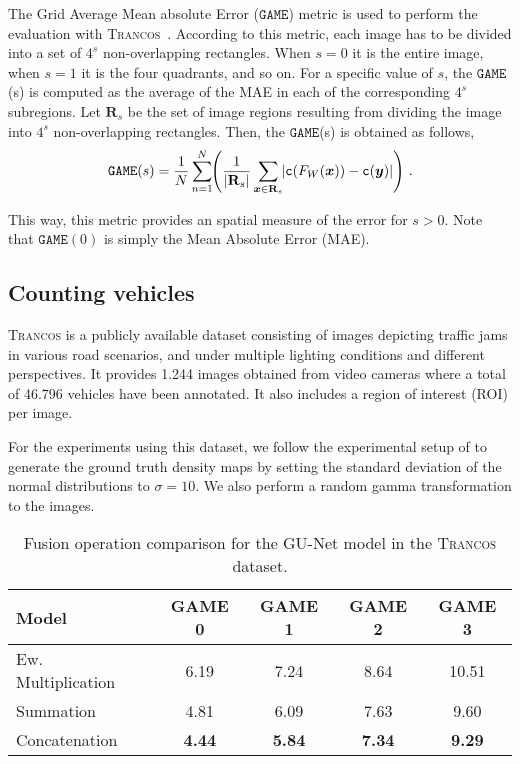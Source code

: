 \documentclass{bmvc2k}
\begin{document}
The Grid Average Mean absolute Error ($\mathtt{GAME}$) metric is used to perform the evaluation with \textsc{Trancos}~\cite{guerrero2015}. According to this metric, each image has to be divided into a set of $4^s$ non-overlapping rectangles. When $s=0$ it is the entire image, when $s=1$ it is the four quadrants, and so on. For a specific value of $s$, the $\mathtt{GAME}$(s) is computed as the average of the MAE in each of the corresponding $4^s$ subregions. Let $\mathbf{R}_{s}$ be the set of image regions resulting from dividing the image into $4^s$ non-overlapping rectangles. Then, the $\mathtt{GAME}$(s) is obtained as follows,
\vspace{-0.25cm}\begin{equation}
\mathtt{GAME}(s) = \frac{1}{N} \sum^{N}_{n=1} \hspace{-1mm} \left( \frac{1}{|\mathbf{R}_s|} \sum_{\boldsymbol{x} \in \mathbf{R}_s} \hspace{-1mm} \left| \mathtt{c}(F_W(\boldsymbol{x})) - \mathtt{c}(\boldsymbol{y})  \right|\right)\, .
\end{equation}

This way, this metric provides an spatial measure of the error for $s > 0$. Note that $\mathtt{GAME}(0)$ is simply the Mean Absolute Error (MAE).

\subsection{Counting vehicles}\textsc{Trancos} is a publicly available dataset consisting of images depicting traffic jams in various road scenarios, and under multiple lighting conditions and different perspectives. It provides 1.244 images obtained from video cameras where a total of 46.796 vehicles have been annotated. It also includes a region of interest (ROI) per image.

For the experiments using this dataset, we follow the experimental setup of \cite{guerrero2015} to generate the ground truth density maps by setting the standard deviation of the normal distributions to $\sigma=10$. We also perform a random gamma transformation to the images.

\begin{table}[t!]
\small
\centering
\caption{Fusion operation comparison for the GU-Net model in the \textsc{Trancos} dataset.}
\label{tab:trancos_fusion}
\begin{tabular}{|l|c|c|c|c|}
\hline
Model                           & GAME 0 & GAME 1 & GAME 2 & GAME 3 \\
\hline
\hline
Ew. Multiplication              & 6.19   & 7.24   & 8.64   & 10.51   \\
\hline
Summation                       & 4.81   & 6.09   & 7.63   & 9.60   \\
\hline
Concatenation                   & \textbf{4.44}   & \textbf{5.84}   & \textbf{7.34}   & \textbf{9.29}   \\
\hline
\end{tabular}
\end{table}
\end{document}
